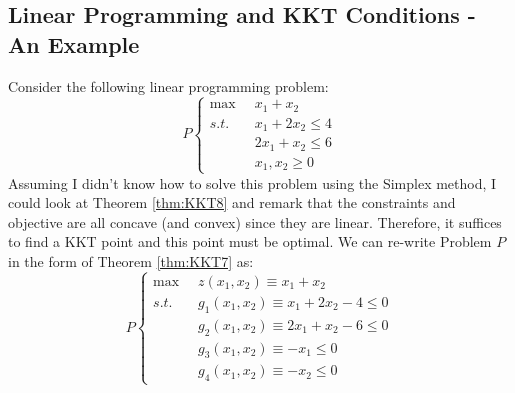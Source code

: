 \subsection{Linear Programming and KKT Conditions - An Example}
Consider the following linear programming problem:
\begin{equation}
P \left \{
\begin{aligned}
\max \;\; & x_1 + x_2  \\ 
s.t. & x_1 + 2x_2 \leq 4\\
& 2x_1 + x_2 \leq 6\\
& x_1, x_2 \geq 0
\end{aligned} \right.
\end{equation}
Assuming I didn't know how to solve this problem using the Simplex method, I could look at Theorem \ref{thm:KKT8} and remark that the constraints and objective are all concave (and convex) since they are linear. Therefore, it suffices to find a KKT point and this point must be optimal.
We can re-write Problem $P$ in the form of Theorem \ref{thm:KKT7} as:
\begin{displaymath}
P \left \{
\begin{aligned}
\max \;\; & z(x_1,x_2) \equiv x_1 + x_2  \\ 
s.t. & g_1(x_1,x_2) \equiv x_1 + 2x_2 -4 \leq 0\\
& g_2(x_1,x_2) \equiv 2x_1 + x_2 - 6\leq 0\\
& g_3(x_1,x_2) \equiv -x_1 \leq 0\\
& g_4(x_1,x_2) \equiv -x_2 \leq 0
\end{aligned} \right.
\end{displaymath}


